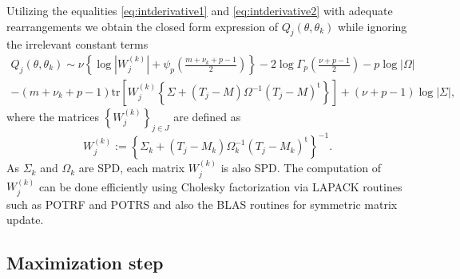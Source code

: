 \documentclass[english,listof=totoc]{scrartcl}
\begin{document}
Utilizing the equalities \eqref{eq:intderivative1} and \eqref{eq:intderivative2} with adequate rearrangements we obtain the closed form expression of $Q_j(\theta,\theta_k)$ while ignoring the irrelevant constant terms
\begin{equation}
\begin{split}Q_j(\theta,\theta_k) \sim \nu\left\{\log|W_j^{(k)}|+\psi_{p}\left(\frac{m+\nu_k+p-1}{2}\right)\right\}-2\log\Gamma_{p}\left(\frac{\nu+p-1}{2}\right)-p\log|\Omega|\\
-(m+\nu_k+p-1)\textrm{tr}\left[W_j^{(k)}\left\{\Sigma+(T_j-M)\Omega^{-1}(T_j-M)^{\textrm{t}}\right\}\right]+(\nu+p-1)\log |\Sigma|,
\end{split}
\label{eq:fsimp}
\end{equation}
where the matrices $\left\{W_j^{(k)}\right\}_{j\in J}$ are defined as
\begin{equation}
W_j^{(k)}:=\left\{\Sigma_k+(T_j-M_k)\Omega_k^{-1}(T_j-M_k)^{\textrm{t}}\right\}^{-1}.
\end{equation}
As $\Sigma_k$ and $\Omega_k$ are SPD, each matrix $W_j^{(k)}$ is also SPD. The computation of $W_j^{(k)}$ can be done efficiently using Cholesky factorization via LAPACK routines such as POTRF and POTRS and also the BLAS routines for symmetric matrix update.

\subsection{Maximization step}
\end{document}
